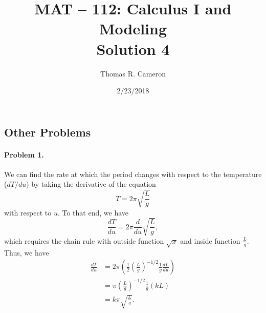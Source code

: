 \documentclass{article}
\title{MAT -- 112: Calculus I and Modeling\\
\large{Solution 4}}
\author{Thomas R. Cameron}
\date{2/23/2018}
\begin{document}
\maketitle

\subsection*{Other Problems}

\paragraph*{Problem 1.}	We can find the rate at which the period changes with respect to the temperature ($dT/du$) by taking the derivative of the equation
\[
T=2\pi\sqrt{\frac{L}{g}}
\]
with respect to $u$. To that end, we have
\[
\frac{dT}{du}=2\pi\frac{d}{du}\sqrt{\frac{L}{g}},
\]
which requires the chain rule with outside function $\sqrt{x}$ and inside function $\frac{L}{g}$. Thus, we have
\begin{align*}
\frac{dT}{du}&=2\pi\left(\frac{1}{2}\left(\frac{L}{g}\right)^{-1/2}\frac{1}{g}\frac{dL}{du}\right) \\
&=\pi\left(\frac{L}{g}\right)^{-1/2}\frac{1}{g}(kL) \\
&=k\pi\sqrt{\frac{L}{g}}.
\end{align*}
\end{document}
